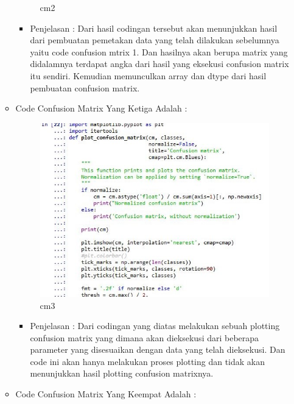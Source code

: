 \begin{enumerate}
\begin{itemize}
\begin{figure}[ht]
\caption{cm2}
\label{contoh}
\end{figure}
\par
\begin{itemize}
\item Penjelasan : Dari hasil codingan tersebut akan menunjukkan hasil dari pembuatan pemetakan data yang telah dilakukan sebelumnya yaitu code confusion mtrix 1. Dan hasilnya akan  berupa matrix yang didalamnya terdapat angka dari hasil yang eksekusi confusion matrix itu sendiri. Kemudian memunculkan array dan dtype dari hasil pembuatan confusion matrix.
\par
\par
\end{itemize}
\item Code Confusion Matrix Yang Ketiga Adalah :
\par
\begin{figure}[ht]
\centering
\includegraphics[scale=0.2]{figures/cm3cahya.jpg}
\caption{cm3}
\label{contoh}
\end{figure}
\par
\begin{itemize}
\item Penjelasan : Dari codingan yang diatas melakukan sebuah plotting confusion matrix yang dimana akan dieksekusi dari beberapa parameter yang disesuaikan dengan data yang telah dieksekusi. Dan code ini akan hanya melakukan proses plotting dan tidak akan menunjukkan hasil plotting confusion matrixnya.
\par
\par
\end{itemize}
\item Code Confusion Matrix Yang Keempat Adalah :

\end{itemize}
\end{enumerate}
